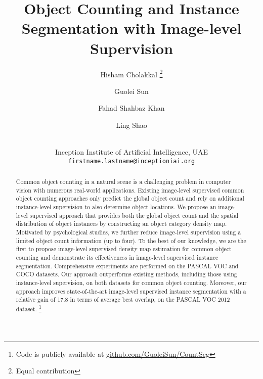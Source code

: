 \documentclass[10pt,twocolumn,letterpaper]{article}
\begin{document}
\title{Object Counting and Instance Segmentation with Image-level Supervision}
\author{Hisham  Cholakkal \thanks{Equal contribution} \and Guolei Sun \footnotemark[1] \and Fahad Shahbaz Khan \and Ling Shao \and \\
Inception Institute of Artificial Intelligence, UAE\\
{\tt\small {firstname.lastname}@inceptioniai.org}
}





\maketitle


\begin{abstract}
  Common object counting in a natural scene is a challenging problem in computer vision with numerous real-world applications. Existing image-level supervised common object counting approaches only predict the global object count and rely on additional instance-level supervision to also determine object locations. We propose an image-level supervised approach that provides both the global object count and the spatial distribution of object instances by constructing an object category density map. Motivated by psychological studies, we further reduce image-level supervision using a limited object count information (up to four). To the best of our knowledge, we are the first to propose image-level supervised density map estimation for common object counting and demonstrate its effectiveness in image-level supervised instance segmentation.  Comprehensive experiments are performed on the PASCAL VOC and COCO datasets. Our approach outperforms existing methods, including those using instance-level supervision, on both datasets for common object counting. Moreover, our approach  improves state-of-the-art image-level supervised instance segmentation \cite{PRM} with a relative gain of 17.8 in terms of average best overlap, on the PASCAL VOC 2012 dataset. \footnote{Code is publicly available at \href {https://github.com/GuoleiSun/CountSeg}{github.com/GuoleiSun/CountSeg}}
 
  


  








\end{abstract}
\end{document}
